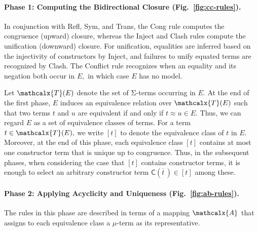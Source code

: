 \documentclass[smallcondensed,draft]{svjour3}
\newcommand\Sig{\mathrm{\Sigma}}
\newcommand\const[1]{\textsf{#1}}
\renewcommand{\vec}[1]{\bar #1}
\newcommand{\Ec}{E}
\newcommand{\tEc}{\Terms(\Ec)}
\newcommand{\rn}[1]{\textsf{#1}}
\newcommand{\teq}{\approx}
\newcommand{\ec}[1]{[#1]}
\newcommand{\Val}{\mathcalx{A}\vvthinspace}
\newcommand\Terms{\mathcalx{T}}
\newcommand\vvthinspace{\kern+0.041667em}
\begin{document}
\paragraph{Phase 1: Computing the Bidirectional Closure \rm(Fig.~\ref{fig:cc-rules}).}
In conjunction with \rn{Refl}, \rn{Sym}, and \rn{Trans}, the \rn{Cong} rule computes the congruence (upward) closure,
whereas the \rn{Inject} and \rn{Clash} rules %
compute the unification (downward) closure.
For unification, %
equalities are inferred based on the injectivity of constructors by \rn{Inject},
and failures to unify equated terms are recognized by \rn{Clash}.
The \rn{Conflict} rule recognizes when an equality and its negation both occur in $\Ec,$ in which case $\Ec$ has no model.

Let $\tEc$ denote the set of $\Sig$-terms occurring in $\Ec.$
At the end of the first phase, $\Ec$ induces an equivalence
relation over $\tEc$ such that two terms $t$ and $u$ are equivalent if and
only if $t \teq u \in \Ec.$
Thus, we can regard $\Ec$ as a set of
equivalence classes of terms. For a term $t \in \tEc,$ we write $\ec{t}$ to
denote the equivalence class of $t$ in $\Ec.$
Moreover, at the end of this phase, each equivalence class $\ec{t}$ contains
at most %
one constructor term that is unique up to congruence.
Thus, in the subsequent phases,
when considering the case that $\ec{t}$ contains constructor terms,
it is enough %
to select an arbitrary constructor term $\const{C}( \vec t\, ) \in \ec{t}$ among these.

\paragraph{Phase 2: Applying Acyclicity and Uniqueness \rm(Fig.~\ref{fig:ab-rules}).}
The rules in this phase are described in terms of a mapping $\Val$
that assigns to each equivalence class a $\mu$-term as its representative.
\end{document}
